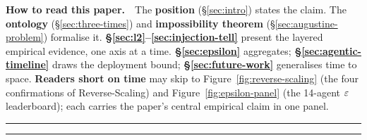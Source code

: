 \documentclass[11pt]{article}
\begin{document}
\vspace{0.15cm}
\begin{center}
\begin{minipage}{0.94\textwidth}
\small\rmfamily
\textbf{\color{AugustineNavy}How to read this paper.}\ \
The \textbf{position} (\S\ref{sec:intro}) states the claim. The \textbf{ontology} (\S\ref{sec:three-times}) and \textbf{impossibility theorem} (\S\ref{sec:augustine-problem}) formalise it. \textbf{\S\ref{sec:l2}--\ref{sec:injection-tell}} present the layered empirical evidence, one axis at a time. \textbf{\S\ref{sec:epsilon}} aggregates; \textbf{\S\ref{sec:agentic-timeline}} draws the deployment bound; \textbf{\S\ref{sec:future-work}} generalises time to space. \textbf{Readers short on time} may skip to Figure~\ref{fig:reverse-scaling} (the four confirmations of Reverse-Scaling) and Figure~\ref{fig:epsilon-panel} (the 14-agent $\varepsilon$ leaderboard); each carries the paper's central empirical claim in one panel.
\end{minipage}
\end{center}

\vspace{0.2cm}
\hrule
\vspace{0.15cm}
{\small\tableofcontents}
\vspace{0.15cm}
\hrule
\vspace{0.25cm}





























\end{document}
